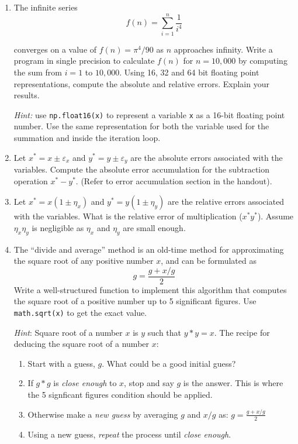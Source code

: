 \documentclass[a4paper,12pt]{article}
\begin{document}
\begin{enumerate}
	\item The infinite series
	\begin{equation*}
		f(n) = \sum_{i = 1}^{n} \frac{1}{i^4}
	\end{equation*}
	
	converges on a value of $f(n) = \pi^4/90$ as $n$ approaches infinity.
	Write a program in single precision to calculate $f(n)$ for $n = 10,000$
	by computing the sum from $i = 1$ to $10,000$. Using 16, 32 and 64 bit floating point representations, compute the absolute and relative errors. Explain your results. 
	
	\textit{Hint:} use \verb|np.float16(x)| to represent a variable \verb|x| as a 16-bit floating point number. Use the same representation for both the variable used for the summation and inside the iteration loop.
	
	\item Let $x^* = x \pm \varepsilon_x$ and $y^* =  y \pm \varepsilon_y$ are the absolute errors associated with the variables. Compute the absolute error accumulation for the subtraction operation $x^* - y^*$. (Refer to error accumulation section in the handout).
	
	\item Let $x^* = x (1 \pm \eta_x)$ and $y^* =  y  (1 \pm \eta_y)$ are the relative errors associated with the variables. What is the relative error of multiplication ($x^*y^*$). Assume $\eta_x\eta_y$ is negligible as $\eta_x$ and $\eta_y$ are small enough.
	
	\item The ``divide and average'' method is an old-time method for approximating the square root of any positive number $x$, and can be formulated as
	\begin{equation*}
		g = \frac{g + x / g}{2}
	\end{equation*}
	Write a well-structured function to implement this algorithm that computes the square root of a positive number up to 5 significant figures. Use \verb|math.sqrt(x)| to get the exact value.
	
	\textit{Hint}: Square root of a number $x$ is $y$ such that $y*y = x$.
	The recipe for deducing the square root of a number $x$:
		\begin{enumerate}
			\item Start with a guess, $g$. What could be a good initial guess?
			\item If $g*g$ is \textit{close enough} to $x$, stop and say $g$ is the answer. This is where the 5 signficant figures condition should be applied. 
			\item Otherwise make a \textit{new guess} by averaging $g$ and $x/g$ as: $	g = \frac{g + x / g}{2}$
			\item Using a new guess, \textit{repeat} the process until \textit{close enough}. 
		\end{enumerate}
	

\end{enumerate}
\end{document}
